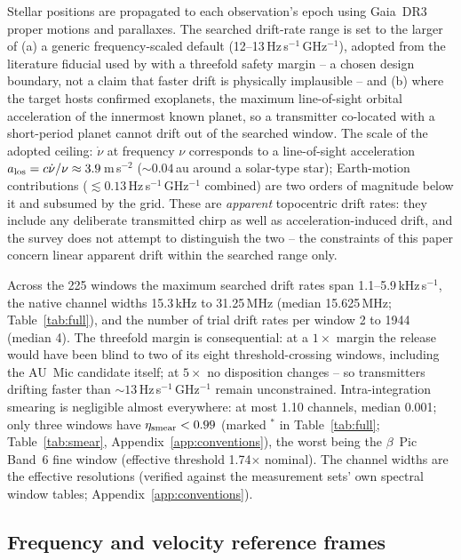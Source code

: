 \documentclass{openjournal}
\begin{document}
Stellar positions are propagated to each observation's epoch using
Gaia~DR3 proper motions and parallaxes. The searched drift-rate range
is set to the larger of (a) a generic frequency-scaled default
(12--13\,Hz\,s$^{-1}$\,GHz$^{-1}$), adopted from the literature
fiducial used by \citet{Mason2024} with a threefold safety margin --
a chosen design boundary, not a claim that faster drift is physically
implausible -- and (b) where the target hosts confirmed exoplanets,
the maximum line-of-sight orbital acceleration of the innermost known
planet, so a transmitter co-located with a short-period planet cannot
drift out of the searched window. The scale of the adopted ceiling:
$\dot\nu$ at frequency $\nu$ corresponds to a line-of-sight
acceleration $a_{\rm los} = c\dot\nu/\nu \approx 3.9$\,m\,s$^{-2}$
(${\sim}0.04$\,au around a solar-type star); Earth-motion
contributions ($\lesssim0.13$\,Hz\,s$^{-1}$\,GHz$^{-1}$ combined)
are two orders of magnitude below it and subsumed by the grid. These
are \emph{apparent} topocentric drift rates: they include any
deliberate transmitted chirp as well as acceleration-induced drift,
and the survey does not attempt to distinguish the two -- the
constraints of this paper concern linear apparent drift within the
searched range only.

Across the 225 windows the maximum searched drift rates span
1.1--5.9\,kHz\,s$^{-1}$, the native channel widths 15.3\,kHz to
31.25\,MHz (median 15.625\,MHz; Table~\ref{tab:full}), and the number
of trial drift rates per window 2 to 1944 (median 4). The threefold
margin is consequential: at a $1\times$ margin the release would have
been blind to two of its eight threshold-crossing windows, including
the AU~Mic candidate itself; at $5\times$ no disposition changes --
so transmitters drifting faster than
${\sim}13$\,Hz\,s$^{-1}$\,GHz$^{-1}$ remain unconstrained.
Intra-integration smearing is negligible almost everywhere: at most
1.10 channels, median 0.001; only three windows have
$\eta_{\rm smear} < 0.99$ (marked $^{\ast}$ in Table~\ref{tab:full};
Table~\ref{tab:smear}, Appendix~\ref{app:conventions}), the worst
being the $\beta$~Pic Band~6 fine window (effective threshold
1.74$\times$ nominal). The channel widths are the effective
resolutions (verified against the measurement sets' own spectral
window tables; Appendix~\ref{app:conventions}).

\subsection{Frequency and velocity reference frames}
\label{sec:frames}
\end{document}
